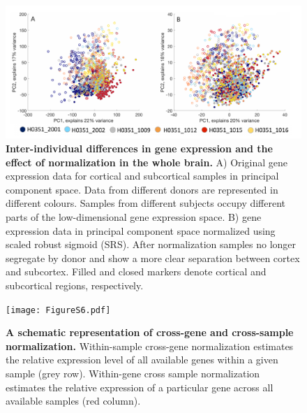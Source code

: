 \documentclass[10pt,A4]{article}
\begin{document}
\begin{figure}[h!]
  \centering
    \includegraphics[width=1\textwidth]{FigureS5.pdf}
\caption{\textbf{Inter-individual differences in gene expression and the effect of normalization in the whole brain.}
A) Original gene expression data for cortical and subcortical samples in principal component space. Data from different donors are represented in different colours. Samples from different subjects occupy different parts of the low-dimensional gene expression space. B) gene expression data in principal component space normalized using scaled robust sigmoid (SRS). After normalization samples no longer segregate by donor and show a more clear separation between cortex and subcortex. Filled and closed markers denote cortical and subcortical regions, respectively.}
\label{FigS5}
\end{figure}

\begin{figure}[h!]
  \centering
    \texttt{[image: FigureS6.pdf]}
\caption{\textbf{A schematic representation of cross-gene and cross-sample normalization.} Within-sample cross-gene normalization estimates the relative expression level of all available genes within a given sample (grey row). Within-gene cross sample normalization estimates the relative expression of a particular gene across all available samples (red column).}
\label{FigS6}
\end{figure}
\end{document}
